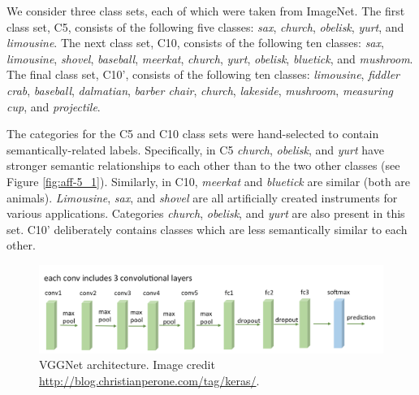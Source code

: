 
We consider three class sets, each of which were taken from ImageNet. The first
class set, C5, consists of the following five classes:
\emph{sax},
\emph{church},
\emph{obelisk},
\emph{yurt}, and
\emph{limousine}.
The next class set, C10, consists of the following ten classes:
\emph{sax},
\emph{limousine},
\emph{shovel},
\emph{baseball},
\emph{meerkat},
\emph{church},
\emph{yurt},
\emph{obelisk},
\emph{bluetick}, and
\emph{mushroom}.
The final class set, C10', consists of the following ten classes:
\emph{limousine},
\emph{fiddler crab},
\emph{baseball},
\emph{dalmatian},
\emph{barber chair},
\emph{church},
\emph{lakeside},
\emph{mushroom},
\emph{measuring cup}, and
\emph{projectile}.

The categories for the C5 and C10 class sets were hand-selected to contain
semantically-related labels. Specifically, in C5 \emph{church}, \emph{obelisk},
and \emph{yurt} have stronger semantic relationships to each other than to the
two other classes (see Figure \ref{fig:aff-5_1}).  Similarly, in C10,
\emph{meerkat} and \emph{bluetick} are similar (both are animals).
\emph{Limousine}, \emph{sax}, and \emph{shovel} are all artificially created
instruments for various applications.  Categories \emph{church}, \emph{obelisk},
and \emph{yurt} are also present in this set.  C10' deliberately contains
classes which are less semantically similar to each other.

\begin{figure}[t]
  \centering
  \includegraphics[width=1.0\textwidth]{figs/vgg16arch.png}
  \caption{
      VGGNet architecture. Image credit
      \url{http://blog.christianperone.com/tag/keras/}.
  }
  \label{fig:vgg16arch}
\end{figure}

